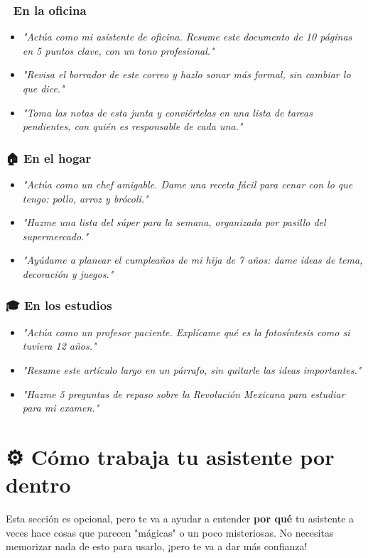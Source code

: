 \documentclass[12pt]{article}
\begin{document}
\subsubsection{🏢 En la oficina}
\begin{itemize}
    \item \textit{"Actúa como mi asistente de oficina. Resume este documento de 10 páginas en 5 puntos clave, con un tono profesional."}
    \item \textit{"Revisa el borrador de este correo y hazlo sonar más formal, sin cambiar lo que dice."}
    \item \textit{"Toma las notas de esta junta y conviértelas en una lista de tareas pendientes, con quién es responsable de cada una."}
\end{itemize}

\subsubsection{🏠 En el hogar}
\begin{itemize}
    \item \textit{"Actúa como un chef amigable. Dame una receta fácil para cenar con lo que tengo: pollo, arroz y brócoli."}
    \item \textit{"Hazme una lista del súper para la semana, organizada por pasillo del supermercado."}
    \item \textit{"Ayúdame a planear el cumpleaños de mi hija de 7 años: dame ideas de tema, decoración y juegos."}
\end{itemize}

\subsubsection{🎓 En los estudios}
\begin{itemize}
    \item \textit{"Actúa como un profesor paciente. Explícame qué es la fotosíntesis como si tuviera 12 años."}
    \item \textit{"Resume este artículo largo en un párrafo, sin quitarle las ideas importantes."}
    \item \textit{"Hazme 5 preguntas de repaso sobre la Revolución Mexicana para estudiar para mi examen."}
\end{itemize}

\newpage
\section{⚙️ Cómo trabaja tu asistente por dentro}
Esta sección es opcional, pero te va a ayudar a entender \textbf{por qué} tu asistente a veces hace cosas que parecen "mágicas" o un poco misteriosas. No necesitas memorizar nada de esto para usarlo, ¡pero te va a dar más confianza! 💪
\end{document}
